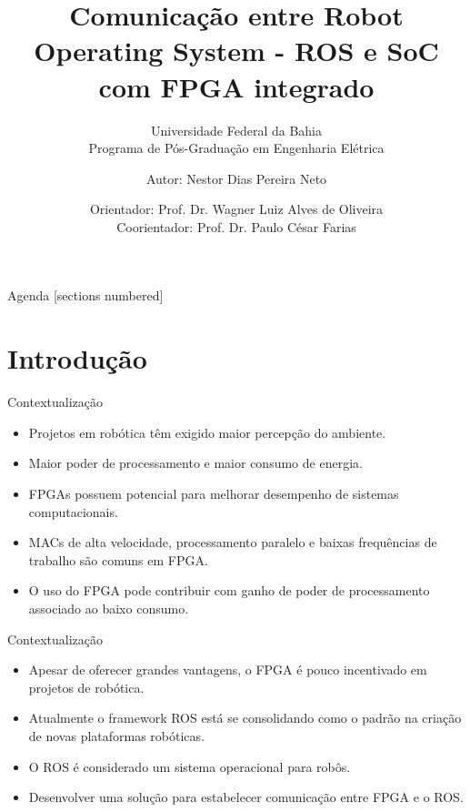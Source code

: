 \documentclass[10pt]{beamer}
\title{Comunicação entre Robot Operating System - ROS e SoC com FPGA integrado}
\subtitle{Universidade Federal da Bahia\\
            Programa de Pós-Graduação em Engenharia Elétrica}
\date{Orientador: Prof. Dr. Wagner Luiz Alves de Oliveira\\Coorientador: Prof. Dr. Paulo César Farias}
\author{Autor: Nestor Dias Pereira Neto}
\institute{Salvador, 6 de dezembro de 2022}
\begin{document}
\maketitle

\begin{frame}{Agenda}
  [sections numbered]
  \tableofcontents[hideallsubsections]
\end{frame}


\section{Introdução}

\begin{frame}{Contextualização}
	\begin{alertblock}{}
    	\begin{itemize}
		\setlength\itemsep{0.7em}
    	\item Projetos em robótica têm exigido maior percepção do ambiente.
    	\item Maior poder de processamento e maior consumo de energia.
    	\item FPGAs possuem potencial para melhorar desempenho de sistemas computacionais.
    	\item MACs de alta velocidade, processamento paralelo e baixas frequências de trabalho são comuns em FPGA. 
    	\item O uso do FPGA pode contribuir com ganho de poder de processamento associado ao baixo consumo.
    	\end{itemize}
    \end{alertblock}
 \nocite{rosEfetiveProgram, CycloneV, FPGAXilinx, fpgarobotics, SocFPGAprocessor,RosPKG, DE10nano}
\end{frame}

\begin{frame}{Contextualização}
	\begin{alertblock}{}
    	\begin{itemize}%
		\setlength\itemsep{1em}
		\item Apesar de oferecer grandes vantagens, o FPGA é pouco incentivado em projetos de robótica.
    	\item Atualmente o framework ROS está se consolidando como o padrão na criação de novas plataformas robóticas.
    	\item O ROS é considerado um sistema operacional para robôs.
    	\item Desenvolver uma solução para estabelecer comunicação entre FPGA e o ROS.
    	\end{itemize}
    \end{alertblock}
 \nocite{LwIP,freertosbook,ROSeffect,PDSfpga,NiosIIbook,ROSfpga}
\end{frame}
\end{document}
